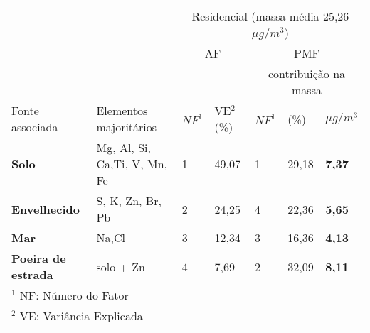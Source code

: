\begin{tabular}{llll|lll}
\hline
                                                  &                        & \multicolumn{5}{c}{Residencial (massa média 25,26 $\mu g / m^3$)}     \\
                                                  &                        & \multicolumn{2}{c}{AF}      & \multicolumn{3}{c}{PMF} \\
\hline
 & & & & \multicolumn{3}{c}{contribuição na massa} \\
Fonte associada                                   & Elementos majoritários & $NF^1$   & VE$^2$ (\%)               & $NF^1$   & (\%)   & $\mu g / m^3$ \\
\hline
\textbf{Solo}                                                    & Mg, Al, Si, Ca,Ti, V, Mn, Fe & 1  & 49,07               & 1      & 29,18 & \textbf{7,37}  \\
\textbf{Envelhecido} & S, K, Zn, Br, Pb             & 2  & 24,25               & 4      & 22,36 & \textbf{5,65}  \\
\textbf{Mar}                                                     & Na,Cl                        & 3  & 12,34               & 3      & 16,36 & \textbf{4,13}  \\
\textbf{Poeira de estrada}                                       & solo + Zn                       & 4  & 7,69                & 2      & 32,09 & \textbf{8,11} \\ 

\hline
\multicolumn{7}{l}{$^1$ NF: Número do Fator} \\
\multicolumn{7}{l}{$^2$ VE: Variância Explicada} \\
\hline
\end{tabular}
